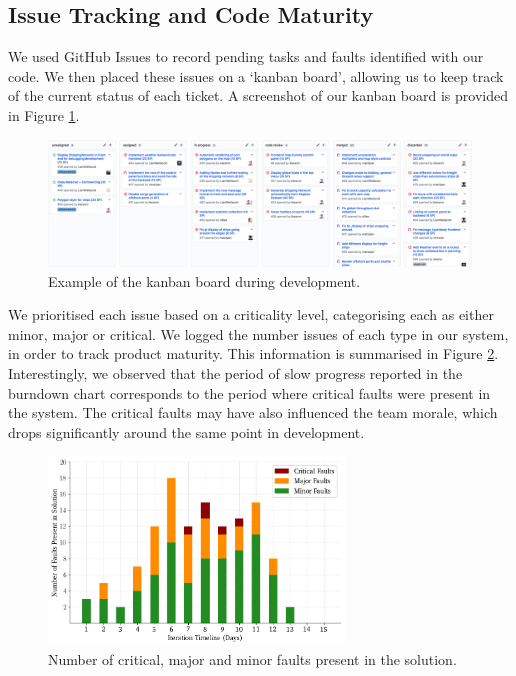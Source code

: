 \subsection{Issue Tracking and Code Maturity}
\label{sec:issuetracking}
We used GitHub Issues to record pending tasks and faults identified with our code. We then placed these issues on a `kanban board’, allowing us to keep track of the current status of each ticket. A screenshot of our kanban board is provided in Figure \ref{fig:kanban_board}.

\begin{figure}[h!]
	\includegraphics[width=\textwidth]{images/kanban_board}
	\caption{Example of the kanban board during development.}
	\label{fig:kanban_board}
\end{figure}

We prioritised each issue based on a criticality level, categorising each as either minor, major or critical. We logged the number issues of each type in our system, in order to track product maturity. This information is summarised in Figure \ref{fig:plot_faults}. Interestingly, we observed that the period of slow progress reported in the burndown chart corresponds to the period where critical faults were present in the system. The critical faults may have also influenced the team morale, which drops significantly around the same point in development.

\begin{figure}[h!]
	\centering
	\includegraphics[width=0.7\textwidth]{images/plot_faults}
	\caption{Number of critical, major and minor faults present in the solution.}
	\label{fig:plot_faults}
\end{figure}

